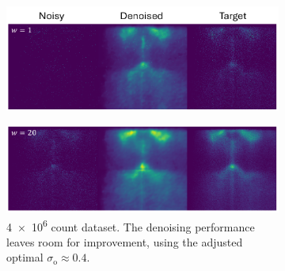 \begin{figure}
    \centering
    \begin{subfigure}[b]{1\linewidth}
        \centering
        \includegraphics[width=1\linewidth]{images/nn_denoised_ex_w_1.pdf}
        \caption{}
        \label{fig:nn-denoised-ex-w-1}
    \end{subfigure}

    \begin{subfigure}[b]{1\linewidth}
        \centering
        \includegraphics[width=1\linewidth]{images/nn_denoised_ex_w_20.pdf}
        \caption{\num{4e6} count dataset. The denoising performance leaves room for improvement, using the adjusted optimal $\sigma_{\text{o}}\approx0.4$.}
        \label{fig:nn-denoised-ex-w-20}
    \end{subfigure}
    \caption{}
    \label{fig:nn-denoised-ex-w}
\end{figure}

